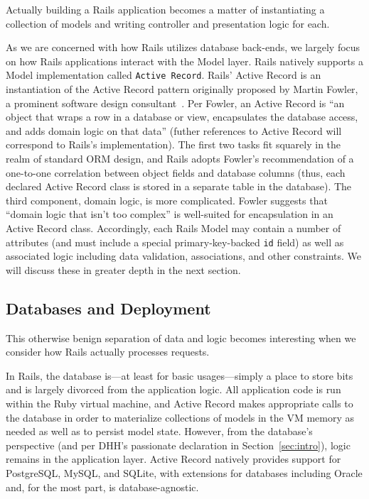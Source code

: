 Actually building a Rails application becomes a matter of instantiating a collection of models and writing controller and presentation logic for each.

As we are concerned with how Rails utilizes database back-ends, we largely focus on how Rails applications interact with the Model layer. Rails natively supports a Model implementation called \texttt{Active Record}. Rails' Active Record is an instantiation of the Active Record pattern originally proposed by Martin Fowler, a prominent software design consultant~\cite{fowler-book}. Per Fowler, an Active Record is ``an object that wraps a row in a database or view, encapsulates the database access, and adds domain logic on that data'' (futher references to Active Record will correspond to Rails's implementation). The first two tasks fit squarely in the realm of standard ORM design, and Rails adopts Fowler's recommendation of a one-to-one correlation between object fields and database columns (thus, each declared Active Record class is stored in a separate table in the database). The third component, domain logic, is more complicated. Fowler suggests that ``domain logic that isn't too complex'' is well-suited for encapsulation in an Active Record class. Accordingly, each Rails Model may contain a number of attributes (and must include a special primary-key-backed \texttt{id} field) as well as associated logic including data validation, associations, and other constraints. We will discuss these in greater depth in the next section.

\subsection{Databases and Deployment}
\label{sec:deployment}

This otherwise benign separation of data and logic becomes interesting when we consider how Rails actually processes requests.

In Rails, the database is---at least for basic usages---simply a place to store bits and is largely divorced from the application logic. All application code is run within the Ruby virtual machine, and Active Record makes appropriate calls to the database in order to materialize collections of models in the VM memory as needed as well as to persist model state. However, from the database's perspective (and per DHH's passionate declaration in Section~\ref{sec:intro}), logic remains in the application layer. Active Record natively provides support for PostgreSQL, MySQL, and SQLite, with extensions for databases including Oracle and, for the most part, is database-agnostic.

